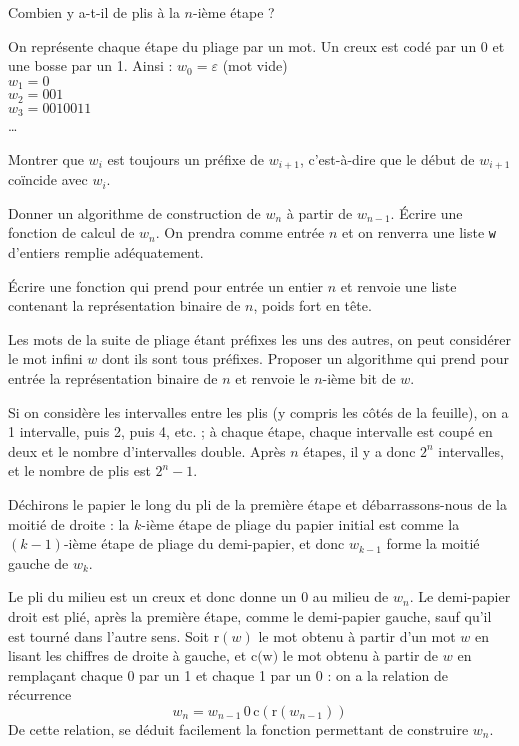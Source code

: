 \Q
Combien y a-t-il de plis à la $n$-ième étape ?

\Q
On représente chaque étape du pliage par un mot. Un creux est codé par un 0 et une bosse par un 1. Ainsi : $w_0=\varepsilon$ (mot vide)\\
$w_1=0$\\
$w_2=001$\\
$w_3=0010011$\\
\dots
\medskip

Montrer que $w_i$ est toujours un préfixe de $w_{i+1}$, c'est-à-dire que le début de $w_{i+1}$ coïncide avec $w_i$.

\Q
Donner un algorithme de construction de $w_n$ à partir de $w_{n-1}$. Écrire une fonction de calcul de $w_n$. On prendra comme entrée $n$ et on renverra une liste \texttt{w} d'entiers remplie adéquatement.

\Q
Écrire une fonction qui prend pour entrée un entier $n$ et renvoie une liste contenant la représentation binaire de $n$, poids fort en tête.

\Q
Les mots de la suite de pliage étant préfixes les uns des autres, on peut considérer le mot infini $w$ dont ils sont tous préfixes. Proposer un algorithme qui prend pour entrée la représentation binaire de $n$ et renvoie le $n$-ième bit de $w$.

\Corrige

\Q
Si on considère les intervalles entre les plis (y compris les côtés de la feuille), on a 1 intervalle, puis 2, puis 4, etc. ; à chaque étape, chaque intervalle est coupé en deux et le nombre d'intervalles double. Après $n$ étapes, il y a donc $2^n$ intervalles, et le nombre de plis est $2^n-1$.

\Q
Déchirons le papier le long du pli de la première étape et débarrassons-nous de la moitié de droite : la $k$-ième étape de pliage du papier initial est comme la $(k-1)$-ième étape de pliage du demi-papier, et donc $w_{k-1}$ forme la moitié gauche de $w_k$.

\Q
Le pli du milieu est un creux et donc donne un 0 au milieu de $w_n$. Le demi-papier droit est plié, après la première étape, comme le demi-papier gauche, sauf qu'il est tourné dans l'autre sens. Soit $\textrm{r}(w)$ le mot obtenu à partir d'un mot $w$ en lisant les chiffres de droite à gauche, et $\textrm{c(w)}$ le mot obtenu à partir de $w$ en remplaçant chaque 0 par un 1 et chaque 1 par un 0 : on a la relation de récurrence
\[
    w_n = w_{n-1}\,0\,\textrm{c}(\textrm{r}(w_{n-1}))
\]
De cette relation, se déduit facilement la fonction permettant de construire $w_n$.

